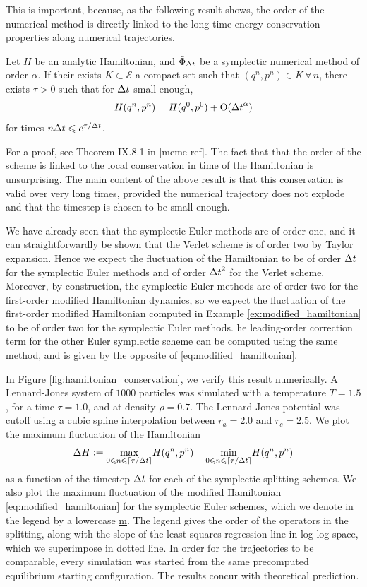     This is important, because, as the following result shows, the order of the numerical method is directly linked to the long-time energy conservation properties along numerical trajectories.
    \begin{theorem}
        Let $H$ be an analytic Hamiltonian, and $\tilde\Phi_{\Delta t}$ be a symplectic numerical method of order $\alpha$.
        If their exists $K\subset \mathcal E$ a compact set such that $(q^n,p^n)\in K\, \forall\, n$, there exists $\tau>0$ such that for ${\Delta t}$ small enough,
        \begin{equation} \label{eq:long_time_energy_conservation}H(q^n,p^n)=H(q^0,p^0)+\mathrm{O}({\Delta t}^\alpha)\end{equation}
        for times $n{\Delta t}\leqslant e^{\tau/{\Delta t}}$.
    \end{theorem}
    For a proof, see Theorem IX.8.1 in [meme ref]. The fact that that the order of the scheme is linked to the local conservation in time of the Hamiltonian is unsurprising.
    The main content of the above result is that this conservation is valid over very long times, provided the numerical trajectory does not explode and that the timestep is chosen to be small enough.
    
    We have already seen that the symplectic Euler methods are of order one, and it can straightforwardly be shown that the Verlet scheme is of order two by Taylor expansion.
    Hence we expect the fluctuation of the Hamiltonian to be of order ${\Delta t}$ for the symplectic Euler methods and of order ${\Delta t}^2$ for the Verlet scheme.
    Moreover, by construction, the symplectic Euler methods are of order two for the first-order modified Hamiltonian dynamics, 
    so we expect the fluctuation of the first-order modified Hamiltonian computed in Example \ref{ex:modified_hamiltonian} to be of order two for the symplectic Euler methods. 
    he leading-order correction term for the other Euler symplectic scheme can be computed using the same method, and is given by the opposite of \eqref{eq:modified_hamiltonian}.

    In Figure \ref{fig:hamiltonian_conservation}, we verify this result numerically. 
    A Lennard-Jones system of $1000$ particles was simulated with a temperature $T=1.5$, for a time $\tau=1.0$, and at density $\rho=0.7$.
    The Lennard-Jones potential was cutoff using a cubic spline interpolation between $r_a=2.0$ and $r_c=2.5$. 
    We plot the maximum fluctuation of the Hamiltonian
    \[\Delta H \mathrel{\mathop:}= \underset{0 \leqslant n \leqslant \lceil \tau/{\Delta t}\rceil}{\max} H(q^n,p^n)-\underset{0 \leqslant n \leqslant \lceil \tau/{\Delta t}\rceil}{\min} H(q^n,p^n)\]
    as a function of the timestep ${\Delta t}$ for each of the symplectic splitting schemes. We also plot the maximum fluctuation of the modified Hamiltonian \eqref{eq:modified_hamiltonian} for the symplectic Euler schemes, which we denote in the legend by a lowercase \underline{m}.
    The legend gives the order of the operators in the splitting, along with the slope of the least squares regression line in log-log space, which we superimpose in dotted line.
    In order for the trajectories to be comparable, every simulation was started from the same precomputed equilibrium starting configuration. The results concur with theoretical prediction.
    
